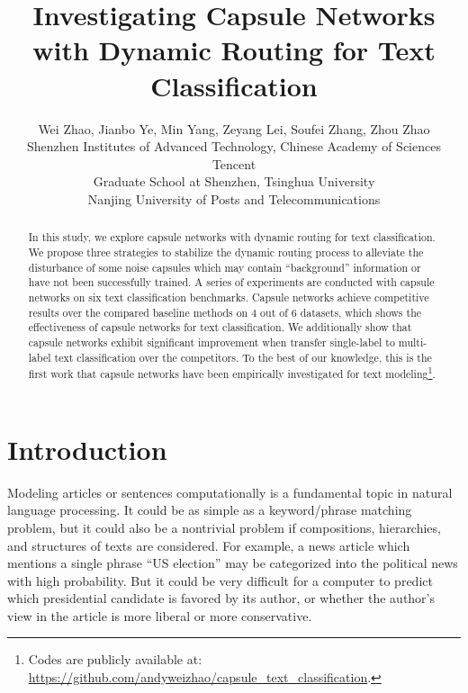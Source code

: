 \documentclass[11pt]{article}
\title{Investigating Capsule Networks with Dynamic Routing for \break Text Classification}
\author{Wei Zhao,  Jianbo Ye,  Min Yang, Zeyang Lei,  Soufei Zhang, Zhou Zhao\\
{ Shenzhen Institutes of Advanced Technology, Chinese Academy of Sciences}\\
{ Tencent} \qquad \qquad { Pennsylvania State University}\\
{ Graduate School at Shenzhen, Tsinghua University }\\
{ Nanjing University of Posts and Telecommunications} \qquad { Zhejiang University} \\
}
\date{}
\begin{document}
\maketitle
\begin{abstract}
In this study, we explore capsule networks with dynamic routing for text classification. We propose three strategies to stabilize the dynamic routing process to alleviate the disturbance of some noise capsules which may contain ``background'' information or have not been successfully trained. A series of experiments are conducted with capsule networks on six text classification benchmarks.  Capsule networks achieve competitive results over the compared baseline methods on 4 out of 6 datasets, which shows the effectiveness of capsule networks for text classification. We additionally show that capsule networks exhibit significant improvement when transfer single-label to multi-label text classification over the competitors. To the best of our knowledge, this is the first work that capsule networks have been empirically investigated for text modeling\footnote{Codes are publicly available at: \url{https://github.com/andyweizhao/capsule_text_classification}.}.
\end{abstract}

\section{Introduction} 
Modeling articles or sentences computationally is a fundamental topic in natural language processing. It could be as simple as 
a keyword/phrase matching problem, but it could also be a nontrivial problem if compositions, hierarchies, 
and structures of texts are considered. For example, a news article which
mentions a single phrase ``US election'' may be categorized into the political news with high probability. 
But it could be very difficult for a computer to predict which presidential candidate is favored by its author,
or whether the author's view in the article is more liberal or more conservative. 
\end{document}
